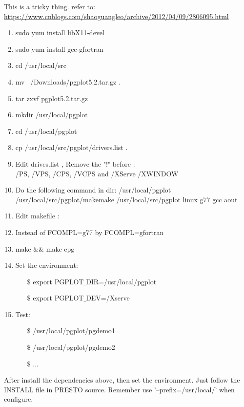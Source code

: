 \documentclass{article}
\begin{document}
	This is a tricky thing. refer to:\\
	 \url{https://www.cnblogs.com/shaoguangleo/archive/2012/04/09/2806095.html} \\
	 \begin{enumerate}[1)]
	 \item sudo yum install libX11-devel
	 \item sudo yum install gcc-gfortran 
	 \item cd /usr/local/src
	 \item mv ~/Downloads/pgplot5.2.tar.gz .
	 \item tar zxvf pgplot5.2.tar.gz
	 \item mkdir /usr/local/pgplot
	 \item cd /usr/local/pgplot
	 \item cp /usr/local/src/pgplot/drivers.list . 
	 \item Edit drives.list , Remove the "!"  before :\\
	 /PS, /VPS, /CPS, /VCPS and /XServe /XWINDOW 
	 \item Do the following command in dir: /usr/local/pgplot\\
	 /usr/local/src/pgplot/makemake /usr/local/src/pgplot linux g77$\_$gcc$\_$aout
	 \item Edit makefile :
	 \item Instead of FCOMPL=g77 by FCOMPL=gfortran
	 \item make $\&\&$ make cpg 
	 \item Set the environment: \\
	 	\begin{itemize}
	 	\item[$\$$] export PGPLOT$\_$DIR=/usr/local/pgplot
	 	\item[$\$$] export PGPLOT$\_$DEV=/Xserve
	 	\end{itemize}
	 \item Test:\\	
	 	\begin{itemize}
	 	\item[$\$$] /usr/local/pgplot/pgdemo1
	 	\item[$\$$] /usr/local/pgplot/pgdemo2
	 	\item[$\$$] ...
	 	\end{itemize}
	 \end{enumerate}
After install the dependencies above, then set the environment. Just follow the INSTALL file in PRESTO source. Remember use '--prefix=/usr/local/' when configure.
\end{document}

